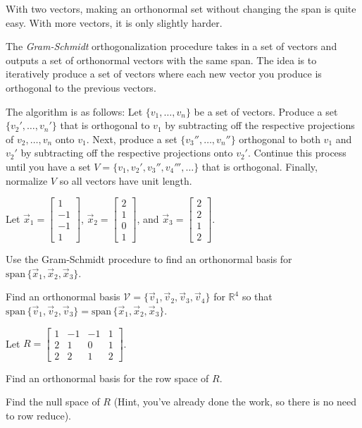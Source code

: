 \documentclass{problemset}
\newcommand{\R}{\mathbb{R}}
\renewcommand{\span}{\mathrm{span}\,}
\newcommand{\mat}[1]{\begin{bmatrix}#1\end{bmatrix}}
\begin{document}
	With two vectors, making an orthonormal set without changing the span
	is quite easy.  With more vectors, it is only slightly harder.

	\begin{definition}
		The \emph{Gram-Schmidt} orthogonalization procedure
		takes in a set of vectors and outputs a set of orthonormal vectors
		with the same span.  The idea is to iteratively produce a set of
		vectors where each new vector you produce is orthogonal to the previous vectors.

		The algorithm is as follows: Let $\{ v_1,\ldots, v_n\}$ be a set of 
		vectors.  Produce a set $\{ v_2',\ldots, v_n'\}$ that is orthogonal
		to $ v_1$ by subtracting off the respective projections
		of $ v_2,\ldots, v_n$
		onto $ v_1$.  Next, produce a set $\{ v_3'',\ldots, v_n''\}$
		orthogonal to both $ v_1$ and $ v_2'$ by subtracting off the
		respective projections
		onto $ v_2'$.  Continue this process until you have a set
		$V=\{ v_1, v_2', v_3'', v_4''',\ldots\}$ that is orthogonal.
		Finally, normalize $V$ so all vectors have unit length.
	\end{definition}

	\question
	Let $\vec x_1=\mat{1\\-1\\-1\\1}$, $\vec x_2=\mat{2\\1\\0\\1}$, and 
	$\vec x_3=\mat{2\\2\\1\\2}$.
	\begin{parts}
		\item Use the Gram-Schmidt procedure to find an orthonormal basis for 
			$\span\{\vec x_1,\vec x_2,\vec x_3\}$.
		\item Find an orthonormal basis $\mathcal V=\{\vec v_1,\vec v_2,\vec v_3,\vec v_4\}$
			for $\R^4$ so that $\span\{\vec v_1,\vec v_2,\vec v_3\}=
			\span\{\vec x_1,\vec x_2,\vec x_3\}$.
	\end{parts}
	Let $R=\mat{1&-1&-1&1\\2&1&0&1\\2&2&1&2}$.
	\begin{parts}[resume]
		\item Find an orthonormal basis for the row space of $R$.
		\item Find the null space of $R$ (Hint, you've already done the work, so
			there is no need to row reduce).
	\end{parts}
\end{document}
